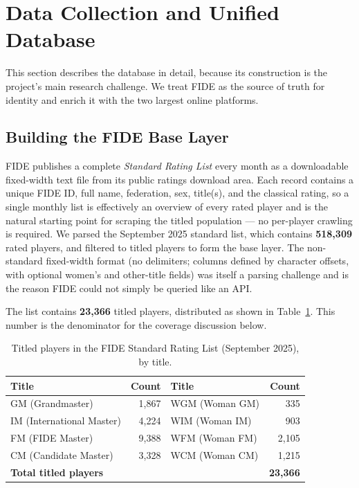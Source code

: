 \documentclass[11pt,a4paper]{article}
\begin{document}
\section{Data Collection and Unified Database}
\label{sec:data}
This section describes the database in detail, because its construction is the project's
main research challenge. We treat FIDE as the source of truth for identity and enrich it with
the two largest online platforms.

\subsection{Building the FIDE Base Layer}
FIDE publishes a complete \emph{Standard Rating List} every month as a downloadable
fixed-width text file from its public ratings download area. Each record contains a unique
FIDE ID, full name, federation, sex, title(s), and the classical rating, so a single monthly
list is effectively an overview of every rated player and is the natural starting point for
scraping the titled population --- no per-player crawling is required. We parsed the September
2025 standard list, which contains \textbf{518{,}309} rated players, and filtered to titled
players to form the base layer. The non-standard fixed-width format (no delimiters; columns
defined by character offsets, with optional women's and other-title fields) was itself a
parsing challenge and is the reason FIDE could not simply be queried like an API.

The list contains \textbf{23{,}366} titled players, distributed as shown in
Table~\ref{tab:fide_titles}. This number is the denominator for the coverage discussion
below.

\begin{table}[H]
\caption{Titled players in the FIDE Standard Rating List (September 2025), by title.}
\label{tab:fide_titles}
\centering
\begin{tabular}{lr lr}
\toprule
Title & Count & Title & Count \\
\midrule
GM (Grandmaster)            & 1{,}867 & WGM (Woman GM)        & 335   \\
IM (International Master)    & 4{,}224 & WIM (Woman IM)        & 903   \\
FM (FIDE Master)            & 9{,}388 & WFM (Woman FM)        & 2{,}105 \\
CM (Candidate Master)       & 3{,}328 & WCM (Woman CM)        & 1{,}215 \\
\midrule
\multicolumn{3}{l}{\textbf{Total titled players}} & \textbf{23{,}366} \\
\bottomrule
\end{tabular}
\end{table}
\end{document}
